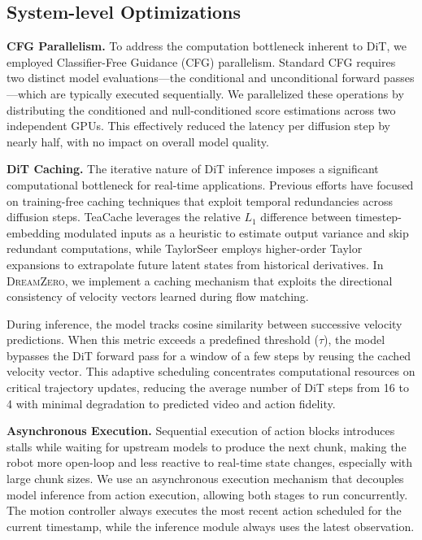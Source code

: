 \documentclass[10pt,logo,copyright]{nvidiatechreport}
\newcommand{\ourmethod}{\mbox{\textsc{DreamZero}}\xspace}
\begin{document}
\subsection{System-level Optimizations}
\textbf{CFG Parallelism.} To address the computation bottleneck inherent to DiT, we employed Classifier-Free Guidance (CFG) parallelism. Standard CFG requires two distinct model evaluations—the conditional and unconditional forward passes—which are typically executed sequentially. We parallelized these operations by distributing the conditioned and null-conditioned score estimations across two independent GPUs. This effectively reduced the latency per diffusion step by nearly half, with no impact on overall model quality.

\textbf{DiT Caching.} The iterative nature of DiT inference imposes a significant computational bottleneck for real-time applications. Previous efforts have focused on training-free caching techniques that exploit temporal redundancies across diffusion steps. TeaCache \citep{liu2024timestep} leverages the relative $L_1$ difference between timestep-embedding modulated inputs as a heuristic to estimate output variance and skip redundant computations, while TaylorSeer \citep{TaylorSeer2025} employs higher-order Taylor expansions to extrapolate future latent states from historical derivatives. In \ourmethod, we implement a caching mechanism that exploits the directional consistency of velocity vectors learned during flow matching.

During inference, the model tracks cosine similarity between successive velocity predictions. When this metric exceeds a predefined threshold ($\tau$), the model bypasses the DiT forward pass for a window of a few steps by reusing the cached velocity vector. This adaptive scheduling concentrates computational resources on critical trajectory updates, reducing the average number of DiT steps from 16 to 4 with minimal degradation to predicted video and action fidelity.


\textbf{Asynchronous Execution.} Sequential execution of action blocks introduces stalls while waiting for upstream models to produce the next chunk, making the robot more open-loop and less reactive to real-time state changes, especially with large chunk sizes. We use an asynchronous execution mechanism that decouples model inference from action execution, allowing both stages to run concurrently. The motion controller always executes the most recent action scheduled for the current timestamp, while the inference module always uses the latest observation.
\end{document}
